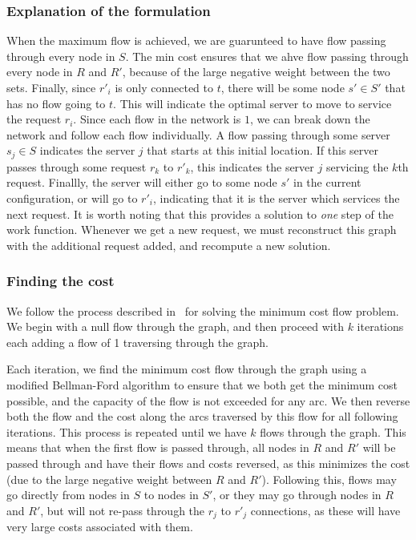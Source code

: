 \subsubsection*{Explanation of the formulation}
When the maximum flow is achieved, we are guarunteed to have flow passing through every node in $S$. The min cost ensures that we ahve flow passing through every node in $R$ and $R'$, because of the large negative weight between the two sets. Finally, since $r'_i$ is only connected to $t$, there will be some node $s' \in S'$ that has no flow going to $t$. This will indicate the optimal server to move to service the request $r_i$. Since each flow in the network is $1$, we can break down the network and follow each flow individually. A flow passing through some server $s_j \in S$ indicates the server $j$ that starts at this initial location. If this server passes through some request $r_k$ to $r'_k$, this indicates the server $j$ servicing the $k$th request. Finallly, the server will either go to some node $s'$ in the current configuration, or will go to $r'_i$, indicating that it is the server which services the next request. It is worth noting that this provides a solution to \textit{one} step of the work function. Whenever we get a new request, we must reconstruct this graph with the additional request added, and recompute a new solution.

\subsubsection*{Finding the cost}

We follow the process described in~\cite{mcfp2011} for solving the minimum cost flow problem. We begin with a null flow through the graph, and then proceed with $k$ iterations each adding a flow of 1 traversing through the graph. 

Each iteration, we find the minimum cost flow through the graph using a modified Bellman-Ford algorithm to ensure that we both get the minimum cost possible, and the capacity of the flow is not exceeded for any arc. We then reverse both the flow and the cost along the arcs traversed by this flow for all following iterations. This process is repeated until we have $k$ flows through the graph. This means that when the first flow is passed through, all nodes in $R$ and $R'$ will be passed through and have their flows and costs reversed, as this minimizes the cost (due to the large negative weight between $R$ and $R'$). Following this, flows may go directly from nodes in $S$ to nodes in $S'$, or they may go through nodes in $R$ and $R'$, but will not re-pass through the $r_j$ to $r'_j$ connections, as these will have very large costs associated with them.